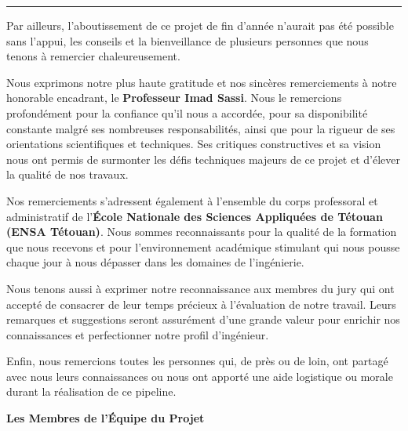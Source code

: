 \documentclass[1pt,a4paper]{report}
\begin{document}
\vspace{0.3cm}
\noindent\rule{\textwidth}{0.5pt}
\vspace{0.3cm}

\noindent Par ailleurs, l'aboutissement de ce projet de fin d'année n'aurait pas été possible sans l'appui, les conseils et la bienveillance de plusieurs personnes que nous tenons à remercier chaleureusement.

\vspace{0.3cm}

\noindent Nous exprimons notre plus haute gratitude et nos sincères remerciements à notre honorable encadrant, le \textbf{Professeur Imad Sassi}. Nous le remercions profondément pour la confiance qu'il nous a accordée, pour sa disponibilité constante malgré ses nombreuses responsabilités, ainsi que pour la rigueur de ses orientations scientifiques et techniques. Ses critiques constructives et sa vision nous ont permis de surmonter les défis techniques majeurs de ce projet et d'élever la qualité de nos travaux.

\vspace{0.3cm}

\noindent Nos remerciements s'adressent également à l'ensemble du corps professoral et administratif de l'\textbf{École Nationale des Sciences Appliquées de Tétouan (ENSA Tétouan)}. Nous sommes reconnaissants pour la qualité de la formation que nous recevons et pour l'environnement académique stimulant qui nous pousse chaque jour à nous dépasser dans les domaines de l'ingénierie.

\vspace{0.3cm}

\noindent Nous tenons aussi à exprimer notre reconnaissance aux membres du jury qui ont accepté de consacrer de leur temps précieux à l'évaluation de notre travail. Leurs remarques et suggestions seront assurément d'une grande valeur pour enrichir nos connaissances et perfectionner notre profil d'ingénieur.

\vspace{0.3cm}

\noindent Enfin, nous remercions toutes les personnes qui, de près ou de loin, ont partagé avec nous leurs connaissances ou nous ont apporté une aide logistique ou morale durant la réalisation de ce pipeline.

\vspace{1cm}

\begin{flushright}
\textbf{Les Membres de l'Équipe du Projet}
\end{flushright}
\newpage
\tableofcontents
\newpage
\end{document}
